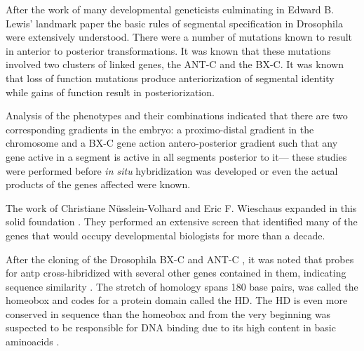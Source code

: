 After the work of many developmental geneticists culminating in Edward B. Lewis' landmark paper \parencite{Lewis1978} the basic rules of segmental specification in Drosophila were extensively understood. There were a number of mutations known to result in anterior to posterior transformations. It was known that these mutations involved two clusters of linked genes, the \ac{ANT-C} and the \ac{BX-C}. It was known that loss of function mutations produce anteriorization of segmental identity while gains of function result in posteriorization. %

Analysis of the phenotypes and their combinations indicated that there are two corresponding gradients in the embryo: a proximo-distal gradient in the chromosome and a \ac{BX-C} gene action antero-posterior gradient such that any gene active in a segment is active in all segments posterior to it--- these studies were performed before \textit{in situ} hybridization was developed or even the actual products of the genes affected were known.


The work of Christiane Nüsslein-Volhard and Eric F. Wieschaus expanded in this solid foundation \parencite{Nuesslein-Volhard1980}. They performed an extensive screen that identified many of the genes that would occupy developmental biologists for more than a decade. %

After the cloning of the Drosophila \ac{BX-C} \parencite{Bender1983} and \ac{ANT-C} \parencite{Garber1983,Scott1983}, it was noted that probes for \ac{antp} cross-hibridized with several other genes contained in them, indicating sequence similarity \parencite{McGinnis1984}.  The stretch of homology spans 180 base pairs, was called the homeobox and codes for a protein domain called the \ac{HD}. The \ac{HD} is even more conserved in sequence than the homeobox and from the very beginning was suspected to be responsible for DNA binding due to its high content in basic aminoacids  \parencite{Gehring1985}.

